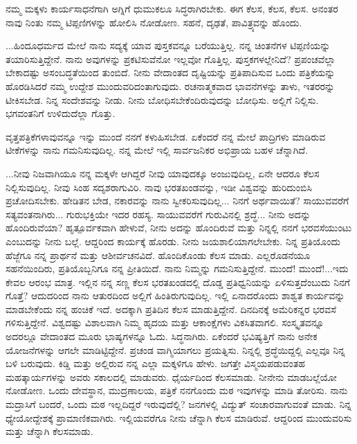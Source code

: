 ನಮ್ಮ ಮಕ್ಕಳು ಕಾರ್ಯಸಾಧನೆಗಾಗಿ ಅಗ್ನಿಗೆ ಧುಮುಕಲೂ ಸಿದ್ಧರಾಗಿರಬೇಕು. ಈಗ ಕೆಲಸ, ಕೆಲಸ, ಕೆಲಸ. ಅನಂತರ ನಾವು ನಿಂತು ನಮ್ಮ ಟಿಪ್ಪಣಿಗಳನ್ನು ಹೋಲಿಸಿ ನೋಡೋಣ. ಸಹನೆ, ದೃಢತೆ, ಪಾವಿತ್ರ್ಯವನ್ನು ಹೊಂದು.

...ಹಿಂದೂಧರ್ಮದ ಮೇಲೆ ನಾನು ಸದ್ಯಕ್ಕೆ ಯಾವ ಪುಸ್ತಕವನ್ನೂ ಬರೆಯುತ್ತಿಲ್ಲ. ನನ್ನ ಚಿಂತನೆಗಳ ಟಿಪ್ಪಣಿಯನ್ನು ತಯಾರಿಸುತ್ತಿದ್ದೇನೆ. ನಾನು ಅವುಗಳನ್ನು ಪ್ರಕಟಿಸುವೆನೋ ಇಲ್ಲವೋ ಗೊತ್ತಿಲ್ಲ. ಪುಸ್ತಕಗಳಲ್ಲೇನಿದೆ? ಪ್ರಪಂಚವೆಲ್ಲಾ ಬೇಕಾದಷ್ಟು ಅಸಂಬದ್ಧತೆಯಿಂದ ತುಂಬಿದೆ. ನೀನು ವೇದಾಂತದ ದೃಷ್ಟಿಯನ್ನು ಪ್ರತಿಪಾದಿಸುವ ಒಂದು ಪತ್ರಿಕೆಯನ್ನು ಹೊರಡಿಸಿದರೆ ನಮ್ಮ ಉದ್ದೇಶ ಮುಂದುವರಿದಂತಾಗುವುದು. ರಚನಾತ್ಮಕವಾದ ಭಾವನೆಗಳನ್ನು ತಾಳು, ಇತರರನ್ನು ಟೀಕಿಸಬೇಡ. ನಿನ್ನ ಸಂದೇಶವನ್ನು ನೀಡು. ನೀನು ಬೋಧಿಸಬೇಕೆಂದಿರುವುದನ್ನು ಬೋಧಿಸು. ಅಲ್ಲಿಗೆ ನಿಲ್ಲಿಸು. ಭಗವಂತನಿಗೆ ಉಳಿದುದೆಲ್ಲಾ ಗೊತ್ತು.

ವೃತ್ತಪತ್ರಿಕೆಗಳಾವುವನ್ನೂ ಇನ್ನು ಮುಂದೆ ನನಗೆ ಕಳುಹಿಸಬೇಡ. ಏಕೆಂದರೆ ನನ್ನ ಮೇಲೆ ಪಾದ್ರಿಗಳು ಮಾಡಿರುವ ಟೀಕೆಗಳನ್ನು ನಾನು ಗಮನಿಸುವುದಿಲ್ಲ. ನನ್ನ ಮೇಲೆ ಇಲ್ಲಿ ಸಾರ್ವಜನಿಕರ ಅಭಿಪ್ರಾಯ ಬಹಳ ಚೆನ್ನಾಗಿದೆ.

...ನೀವು ನಿಜವಾಗಿಯೂ ನನ್ನ ಮಕ್ಕಳೇ ಆಗಿದ್ದರೆ ನೀವು ಯಾವುದಕ್ಕೂ ಅಂಜುವುದಿಲ್ಲ, ಏನೇ ಆದರೂ ಕೆಲಸ ನಿಲ್ಲಿಸುವುದಿಲ್ಲ. ನೀವು ಸಿಂಹ ಸದೃಶರಾಗುವಿರಿ. ನಾವು ಭರತಖಂಡವನ್ನು, ಇಡೀ ವಿಶ್ವವನ್ನು ಹುರಿದುಂಬಿಸಿ ಪ್ರಚೋದಿಸಬೇಕು. ಹೇಡಿತನ ಬೇಡ, ನಕಾರವನ್ನು ನಾನು ಸ್ವೀಕರಿಸುವುದಿಲ್ಲ... ನಿನಗೆ ಅರ್ಥವಾಯಿತೆ? ಸಾಯುವವರೆಗೆ ಸತ್ಯವಂತನಾಗಿರು... ಗುರುಭಕ್ತಿಯೇ ಇದರ ರಹಸ್ಯ. ಸಾಯುವವರೆಗೆ ಗುರುವಿನಲ್ಲಿ ಶ್ರದ್ಧೆ... ನೀನು ಅದನ್ನು ಹೊಂದಿರುವೆಯಾ? ಹೃತ್ಪೂರ್ವಕವಾಗಿ ಹೇಳುವೆ, ನೀನು ಅದನ್ನು ಹೊಂದಿರುವೆ ಮತ್ತು ನಿನ್ನಲ್ಲಿ ನನಗೆ ಭರವಸೆಯುಂಟು ಎಂಬುದನ್ನು ನೀನು ಬಲ್ಲೆ. ಆದ್ದರಿಂದ ಕಾರ್ಯಕ್ಕೆ ಹೊರಡು. ನೀನು ಜಯಶಾಲಿಯಾಗಲೇಬೇಕು. ನಿನ್ನ ಪ್ರತಿಯೊಂದು ಹೆಜ್ಜೆಗೂ ನನ್ನ ಪ್ರಾರ್ಥನೆ ಮತ್ತು ಆಶೀರ್ವಚನವಿದೆ. ಹೊಂದಿಕೊಂಡು ಕೆಲಸ ಮಾಡು. ಎಲ್ಲರೊಡನೆಯೂ ಸಹನೆಯಿಂದಿರು, ಪ್ರತಿಯೊಬ್ಬನಿಗೂ ನನ್ನ ಪ್ರೀತಿಯಿದೆ. ನಾನು ನಿಮ್ಮನ್ನು ಗಮನಿಸುತ್ತಿದ್ದೇನೆ. ಮುಂದೆ! ಮುಂದೆ!...ಇದು ಕೇವಲ ಆರಂಭ ಮಾತ್ರ. ಇಲ್ಲಿನ ನನ್ನ ಸಣ್ಣ ಕೆಲಸ ಭರತಖಂಡದಲ್ಲಿ ದೊಡ್ಡ ಪ್ರತಿಧ್ವನಿಯನ್ನು ಏಳಿಸುತ್ತದೆಂಬುದು ನಿನಗೆ ಗೊತ್ತೆ? ಆದುದರಿಂದ ನಾನು ಆತುರದಿಂದ ಅಲ್ಲಿಗೆ ಹಿಂತಿರುಗುವುದಿಲ್ಲ. ಇಲ್ಲಿ ಏನಾದರೊಂದು ಶಾಶ್ವತ ಕಾರ್ಯವನ್ನು ಮಾಡಬೇಕೆಂದು ನನ್ನ ಹಂಚಿಕೆ ಇದೆ. ಅದಕ್ಕಾಗಿ ಪ್ರತಿದಿನ ಕೆಲಸ ಮಾಡುತ್ತಿದ್ದೇನೆ. ದಿನದಿನಕ್ಕೆ ಅಮೆರಿಕನ್ನರ ಭರವಸೆ ಗಳಿಸುತ್ತಿದ್ದೇನೆ. ವಿಶ್ವದಷ್ಟು ವಿಶಾಲವಾಗಿ ನಿಮ್ಮ ಹೃದಯ ಮತ್ತು ಆಕಾಂಕ್ಷೆಗಳು ವಿಕಸಿತವಾಗಲಿ. ಸಂಸ್ಕೃತವನ್ನೂ ಅದರಲ್ಲೂ ವೇದಾಂತದ ಮೂರು ಭಾಷ್ಯಗಳನ್ನೂ ಓದು. ಸಿದ್ಧನಾಗಿರು. ಏಕೆಂದರೆ ಭವಿಷ್ಯತ್ತಿಗೆ ನಾನು ಅನೇಕ ಯೋಜನೆಗಳನ್ನು ಆಗಲೇ ಮಾಡಿಟ್ಟಿದ್ದೇನೆ. ಪ್ರಚಂಡ ವಾಗ್ಮಿಯಾಗಲು ಪ್ರಯತ್ನಿಸು. ನಿನ್ನಲ್ಲಿ ಶ್ರದ್ಧೆಯಿದ್ದಲ್ಲಿ ಎಲ್ಲವೂ ನಿನ್ನ ಬಳಿ ಬರುವುದು. ಕಿಡ್ಡಿ ಮತ್ತು ಅಲ್ಲಿರುವ ನನ್ನ ಎಲ್ಲಾ ಮಕ್ಕಳಿಗೂ ಹೇಳು. ಜಗತ್ತೇ ವಿಸ್ಮಯಪಡುವಂತಹ ಮಹತ್ಕಾರ್ಯಗಳನ್ನು ಅವರು ಸಕಾಲದಲ್ಲಿ ಮಾಡುವರು. ಧೈರ್ಯದಿಂದ ಕೆಲಸಮಾಡು. ನೀನೇನು ಮಾಡಬಲ್ಲೆಯೋ ನೋಡೋಣ. ಒಂದು ದೇವಸ್ಥಾನ, ಮುದ್ರಣಾಲಯ, ಪತ್ರಿಕೆ ನನಗೊಂದು ಮಠ\enginline{-} ಇವುಗಳನ್ನು ಮಾಡಿ ತೋರಿಸು. ನಾನು ಮದ್ರಾಸಿಗೆ ಬಂದರೆ, ಒಂದು ಮಠ ಇಲ್ಲದಿದ್ದರೆ ಇರುವುದೆಲ್ಲಿ? ಜನಗಳಲ್ಲಿ ವಿದ್ಯುತ್‌ ಸಂಚಾರವಾಗುವಂತೆ ಮಾಡು. ನಿನ್ನ ಧ್ಯೇಯೋದ್ದೇಶಕ್ಕೆ ಪ್ರಾಮಾಣಿಕವಾಗಿರು. ಇಲ್ಲಿಯವರೆಗೂ ನೀನು ಚೆನ್ನಾಗಿ ಕೆಲಸ ಮಾಡಿರುವೆ. ಆದ್ದರಿಂದ ಮುಂದುವರಿಸು ಮತ್ತು ಚೆನ್ನಾಗಿ ಕೆಲಸಮಾಡು.
\eject


